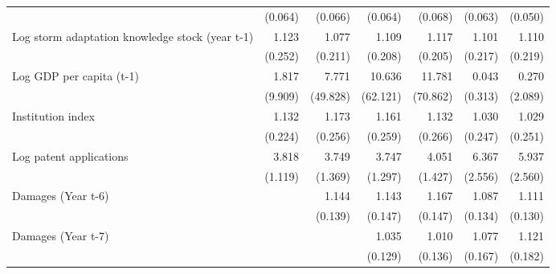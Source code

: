 \begin{table}[htbp]
\begin{tabular}{l*{6}{D{.}{.}{-1}}}
                    &     (0.064)         &     (0.066)         &     (0.064)         &     (0.068)         &     (0.063)         &     (0.050)         \\
\addlinespace
Log storm adaptation knowledge stock (year t-1)&       1.123         &       1.077         &       1.109         &       1.117         &       1.101         &       1.110         \\
                    &     (0.252)         &     (0.211)         &     (0.208)         &     (0.205)         &     (0.217)         &     (0.219)         \\
\addlinespace
Log GDP per capita (t-1)&       1.817         &       7.771         &      10.636         &      11.781         &       0.043         &       0.270         \\
                    &     (9.909)         &    (49.828)         &    (62.121)         &    (70.862)         &     (0.313)         &     (2.089)         \\
\addlinespace
Institution index   &       1.132         &       1.173         &       1.161         &       1.132         &       1.030         &       1.029         \\
                    &     (0.224)         &     (0.256)         &     (0.259)         &     (0.266)         &     (0.247)         &     (0.251)         \\
\addlinespace
Log patent applications&       3.818\sym{***}&       3.749\sym{***}&       3.747\sym{***}&       4.051\sym{***}&       6.367\sym{***}&       5.937\sym{***}\\
                    &     (1.119)         &     (1.369)         &     (1.297)         &     (1.427)         &     (2.556)         &     (2.560)         \\
\addlinespace
Damages (Year t-6)  &                     &       1.144         &       1.143         &       1.167         &       1.087         &       1.111         \\
                    &                     &     (0.139)         &     (0.147)         &     (0.147)         &     (0.134)         &     (0.130)         \\
\addlinespace
Damages (Year t-7)  &                     &                     &       1.035         &       1.010         &       1.077         &       1.121         \\
                    &                     &                     &     (0.129)         &     (0.136)         &     (0.167)         &     (0.182)         \\

\end{tabular}
\end{table}
